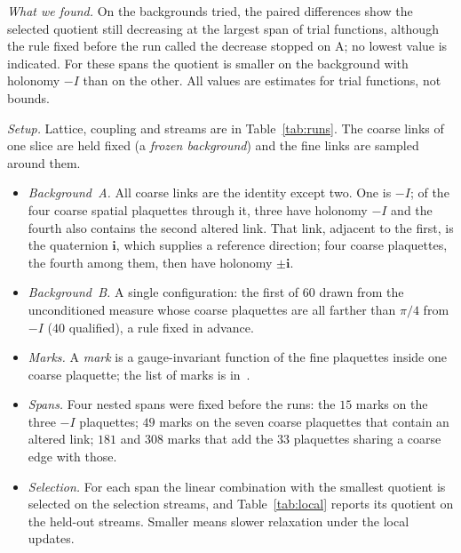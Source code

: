 \emph{What we found.} On the backgrounds tried, the paired differences show the selected quotient still
decreasing at the largest span of trial functions, although the rule fixed before the run called the decrease
stopped on \textsf{A}; no lowest value is indicated. For these spans the quotient is smaller on the background with
holonomy $-I$ than on the other. All values are estimates for trial functions, not bounds.

\emph{Setup.} Lattice, coupling and streams are in Table~\ref{tab:runs}. The coarse links of one slice are
held fixed (a \emph{frozen background}) and the fine links are sampled around them.
\begin{itemize}
\item \emph{Background~\textsf{A}.} All coarse links are the identity except two. One is $-I$; of the four coarse
spatial plaquettes through it, three have holonomy $-I$ and the fourth also contains the second altered link.
That link, adjacent to the first, is the quaternion $\mathbf i$, which supplies a reference direction; four
coarse plaquettes, the fourth among them, then have holonomy $\pm\mathbf i$.
\item \emph{Background~\textsf{B}.} A single configuration: the first of $60$ drawn from the unconditioned measure
whose coarse plaquettes are all farther than $\pi/4$ from $-I$ ($40$ qualified), a rule fixed in advance.
\item \emph{Marks.} A \emph{mark} is a gauge-invariant function of the fine plaquettes inside one coarse
plaquette; the list of marks is in~\cite{RepoData}.
\item \emph{Spans.} Four nested spans were fixed before the runs: the $15$ marks on the three $-I$
plaquettes; $49$ marks on the seven coarse plaquettes that contain an altered link; $181$ and $308$ marks
that add the $33$ plaquettes sharing a coarse edge with those.
\item \emph{Selection.} For each span the linear combination with the smallest quotient is selected on the
selection streams, and Table~\ref{tab:local} reports its quotient on the held-out streams. Smaller means
slower relaxation under the local updates.
\end{itemize}

